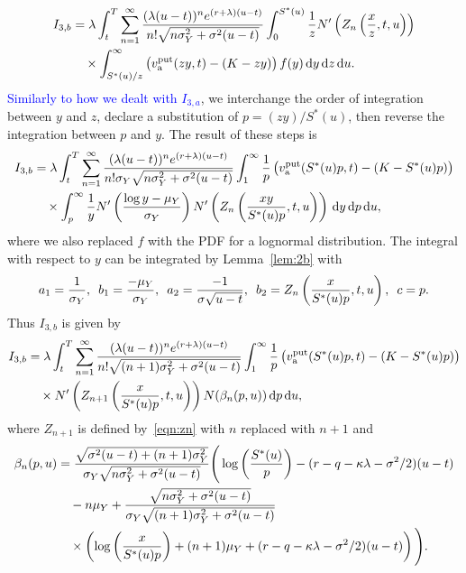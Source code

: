		\begin{align*}
			I_{3,b} &= \lambda \int_t^T \displaystyle\sum\limits_{n=1}^{\infty} \frac{(\lambda(u-t))^ne^{(r+\lambda)(u-t)}}{n!\sqrt{n\sigma_Y^2 + \sigma^2(u-t)}}\int_0^{S^*(u)} \frac{1}{z}  N'\left( Z_n\left( \frac{x}{z},t, u \right) \right) \\
			&\quad {} \times \int_{S^*(u)/z}^\infty \left( v_{\text{a}}^{\text{put}}(zy,t) - (K-zy) \right) f(y) \, \mathrm d y  \, \mathrm d z \, \mathrm d u.
		\end{align*}
		\textcolor{blue}{Similarly to how we dealt with $I_{3,a}$}, we interchange the order of integration between $y$ and $z$, declare a substitution of $p = (zy)/S^*(u)$, then reverse the integration between $p$ and $y$. The result of these steps is
		\begin{align*}
			I_{3,b} &= \lambda \int_t^T \displaystyle\sum\limits_{n=1}^{\infty} \frac{(\lambda(u-t))^ne^{(r+\lambda)(u-t)}}{n!\sigma_Y\sqrt{n\sigma_Y^2 + \sigma^2(u-t)}}\int_1^\infty \frac{1}{p}\left( v_{\text{a}}^{\text{put}}(S^*(u)p,t) - (K-S^*(u)p) \right) \\
			&\quad {} \times \int_p^\infty \frac{1}{y} N'\left( \frac{\log y - \mu_Y}{\sigma_Y} \right) N'\left( Z_n\left( \frac{xy}{S^*(u)p}, t, u \right) \right)\, \mathrm d y  \, \mathrm d p \, \mathrm d u,
		\end{align*}
		where we also replaced $f$ with the PDF for a lognormal distribution. The integral with respect to $y$ can be integrated by Lemma~\ref{lem:2b} with
		$$
			a_1 = \frac{1}{\sigma_Y}, \enskip b_1 = \frac{-\mu_Y}{\sigma_Y}, \enskip a_2 = \frac{-1}{\sigma\sqrt{u-t}}, \enskip
			b_2 = Z_n\left( \frac{x}{S^*(u)p}, t, u \right), \enskip c = p.
		$$
		Thus $I_{3,b}$ is given by
		\begin{align*}
			I_{3,b} &= \lambda \int_t^T \displaystyle\sum\limits_{n=1}^{\infty} \frac{(\lambda(u-t))^ne^{(r+\lambda)(u-t)}}{n!\sqrt{(n+1)\sigma_Y^2 + \sigma^2(u-t)}}\int_1^\infty \frac{1}{p}\left( v_{\text{a}}^{\text{put}}(S^*(u)p,t) - (K-S^*(u)p) \right) \\
			&\quad {} \times N'\left( Z_{n+1}\left( \frac{x}{S^*(u)p}, t, u \right)\right)N(\beta_n(p,u))  \, \mathrm d p \, \mathrm d u,
		\end{align*}
		where $Z_{n+1}$ is defined by~\eqref{eqn:zn} with $n$ replaced with $n+1$ and
		\begin{equation}
			\label{eqn:betan}
			\begin{split}
			\beta_n(p,u) &= \frac{\sqrt{\sigma^2(u-t) + (n+1)\sigma_Y^2}}{\sigma_Y\sqrt{n\sigma_Y^2 + \sigma^2(u-t)}}\Bigg( \log\left(\frac{S^*(u)}{p}\right) - (r-q-\kappa\lambda-\sigma^2/2)(u-t) \\
			&\quad {}  - n\mu_Y + \frac{\sqrt{n\sigma_Y^2 + \sigma^2(u-t)}}{\sigma_Y\sqrt{(n+1)\sigma_Y^2 + \sigma^2(u-t)}} \\ 
			&\quad {} \times \left(\log\left(\frac{x}{S^*(u)p}\right) + (n+1)\mu_Y + (r-q-\kappa\lambda - \sigma^2/2)(u-t)\right) \Bigg).
			\end{split}
		\end{equation}
